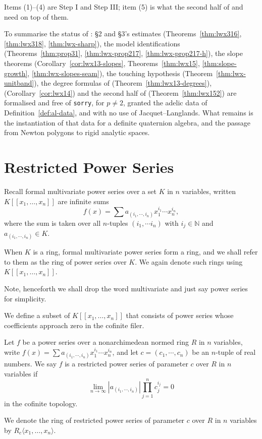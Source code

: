 Items (1)--(4) are Step I and Step III; item (5) is what the second half of
\cite[Theorem 1.5]{LWX} and \cite[Corollary 1.4]{LWX} need on top of them.

To summarise the status of \cite{LWX}: \S2 and \S3's estimates
(Theorems~\ref{thm:lwx316}, \ref{thm:lwx318}, \ref{thm:lwx-sharp}), the model identifications
(Theorems~\ref{thm:prop31}, \ref{thm:lwx-prop217}, \ref{thm:lwx-prop217-h}), the slope theorems
(Corollary~\ref{cor:lwx13-slopes}, Theorems~\ref{thm:lwx15}, \ref{thm:slope-growth},
\ref{thm:lwx-slopes-seam}), the touching hypothesis (Theorem~\ref{thm:lwx-unitband}), the degree
formulas of \cite[Theorem 1.3]{LWX} (Theorem~\ref{thm:lwx13-degrees}), \cite[Corollary 1.4]{LWX}
(Corollary~\ref{cor:lwx14}) and the second half of \cite[Theorem 1.5]{LWX}
(Theorem~\ref{thm:lwx152}) are formalised and free of \texttt{sorry}, for $p \neq 2$, granted the
adelic data of Definition~\ref{def:al-data}, and with no use of Jacquet--Langlands.  What remains
is the instantiation of that data for a definite quaternion algebra, and the passage from Newton
polygons to rigid analytic spaces.


\chapter{Restricted Power Series}

Recall formal multivariate power series over a set $K$ in $n$ variables, written
$K [ \! [ x_1, \dots, x_n ] \! ]$ are infinite sums
\[
  f(x) = \sum a_{(i_1, \cdots, i_n)} x_1^{i_1} \cdots x_n^{i_n},
\]
where the sum is taken over all $n$-tuples $(i_1, \cdots i_n)$ with $i_j \in \mathbb{N}$ and
$a_{(i_1, \cdots, i_n)} \in K$.

When $K$ is a ring, formal multivariate power series form a ring, and we shall refer to them as the
ring of power series over $K$.  We again denote such rings using $K [ \! [ x_1, \dots, x_n ] \! ]$.

Note, henceforth we shall drop the word multivariate and just say power series for simplicity.

We define a subset of $K [ \! [ x_1, \dots, x_n ] \! ]$ that consists of power series whose coefficients
approach zero in the cofinite filer.

\begin{definition}
  Let $f$ be a power series over a nonarchimedean normed ring $R$ in $n$ variables, write
  $f(x) = \sum a_{(i_1, \cdots, i_n)} x_1^{i_1} \cdots x_n^{i_n}$, and let
  $c = (c_1, \cdots, c_n)$ be an $n$-tuple of real numbers.
  We say $f$ is a restricted power series of parameter $c$ over $R$ in $n$ variables if
  \[
    \lim_{n \to \infty} \left\lvert a_{(i_1, \cdots, i_n)} \right\rvert \prod_{j=1}^{n} c_j^{i_j} = 0
  \]
  in the cofinite topology.

  We denote the ring of restricted power series of parameter $c$ over $R$ in $n$ variables by
  $R_c \langle \! x_1, \dots, x_n \! \rangle$.
\end{definition}

